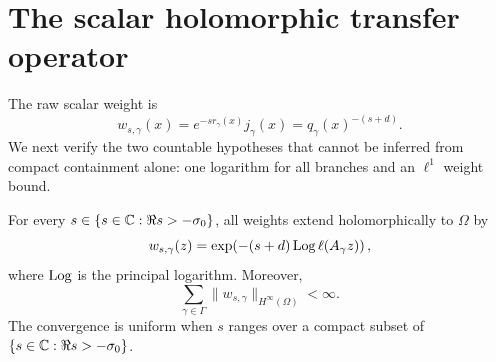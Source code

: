 \section{The scalar holomorphic transfer operator}
\label{sec:scalar-transfer}

The raw scalar weight is
\[
 w_{s,\gamma}(x)
 =e^{-sr_\gamma(x)}j_\gamma(x)
 =q_\gamma(x)^{-(s+d)}.
\]
We next verify the two countable hypotheses that cannot be inferred from
compact containment alone: one logarithm for all branches and an
\(\ell^1\) weight bound.

\begin{lemma}
\label{lem:complex-weight-sum}
For every \(s\in\{s\in\mathbb{C}:\Re s>-\sigma_0\}\), all weights extend holomorphically to
\(\Omega\) by
\begin{equation}
 w_{s,\gamma}(z)
 =\exp\!\left(-(s+d)\operatorname{Log}\ell(A_\gamma z)\right),
 \label{eq:complex-weight}
\end{equation}
where \(\operatorname{Log}\) is the principal logarithm.  Moreover,
\begin{equation}
 \sum_{\gamma\in\Gamma}
 \|w_{s,\gamma}\|_{H^\infty(\Omega)}<\infty.
 \label{eq:complex-l1}
\end{equation}
The convergence is uniform when \(s\) ranges over a compact subset of
\(\{s\in\mathbb{C}:\Re s>-\sigma_0\}\).
\end{lemma}

